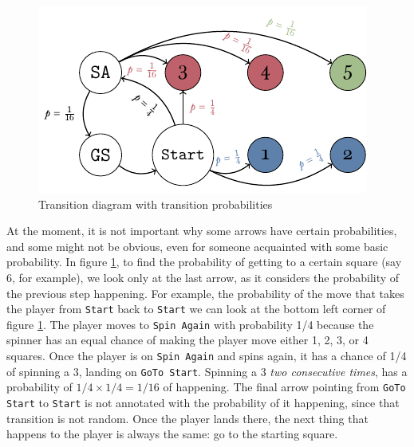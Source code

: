\begin{figure}[h]
	\centering
	\includegraphics[width=\textwidth]{img/transicion-markov.pdf}
	\caption{Transition diagram with transition probabilities}
	\label{fig:annotated-markov-start}
\end{figure}

At the moment, it is not important why some arrows have certain probabilities,
and some might not be obvious, even for someone acquainted with some basic
probability. In figure \ref{fig:annotated-markov-start}, to find the probability
of getting to a certain square (say 6, for example), we look only at the last
arrow, as it considers the probability of the previous step happening. For
example, the probability of the move that takes the player from \texttt{Start}
back to \texttt{Start} we can look at the bottom left corner of figure
\ref{fig:annotated-markov-start}. The player moves to \texttt{Spin Again} with
probability 1/4 because the spinner has an equal chance of making the player
move either 1, 2, 3, or 4 squares. Once the player is on \texttt{Spin Again} and
spins again, it has a chance of 1/4 of spinning a 3, landing on \texttt{GoTo
Start}. Spinning a 3 \textit{two consecutive times}, has a probability of $1/4
\times 1/4 = 1/16$ of happening. The final arrow pointing from \texttt{GoTo
Start} to \texttt{Start} is not annotated with the probability of it happening,
since that transition is not random. Once the player lands there, the next thing
that happens to the player is always the same: go to the starting square.

